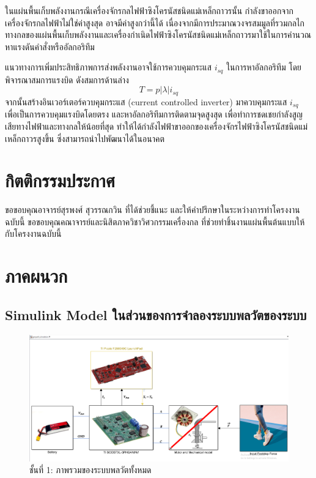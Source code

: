 \documentclass[11pt,a4paper]{article}
\begin{document}
ในแผ่นพื้นเก็บพลังงานกรณีเครื่องจักรกลไฟฟ้าซิงโครนัสชนิดแม่เหล็กถาวรนั้น กำลังขาออกจากเครื่องจักรกลไฟฟ้าไม่ใช่ค่าสูงสุด อาจมีค่าสูงกว่านี้ได้ เนื่องจากมีการประมาณวงจรสมมูลที่รวมกลไกทางกลของแผ่นพื้นเก็บพลังงานและเครื่องกำเนิดไฟฟ้าซิงโครนัสชนิดแม่เหล็กถาวรมาใช้ในการคำนวณหาแรงดันคำสั่งหรืออัลกอริทึม

แนวทางการเพิ่มประสิทธิภาพการส่งพลังงานอาจใช้การควบคุมกระแส $i_{sq}$ ในการหาอัลกอริทึม โดยพิจารณาสมการแรงบิด ดังสมการด้านล่าง
\begin{equation}
    T = p|\lambda|i_{sq}
\end{equation}
จากนั้นสร้างอินเวอร์เตอร์ควบคุมกระแส (current controlled inverter) มาควบคุมกระแส $i_{sq}$ เพื่อเป็นการควบคุมแรงบิดโดยตรง และหาอัลกอริทึมการติดตามจุดสูงสุด เพื่อทำการชดเชยกำลังสูญเสียทางไฟฟ้าและทางกลให้น้อยที่สุด ทำให้ได้กำลังไฟฟ้าขาออกของเครื่องจักรไฟฟ้าซิงโครนัสชนิดแม่เหล็กถาวรสูงขึ้น ซึ่งสามารถนำไปพัฒนาได้ในอนาคต





\section{กิตติกรรมประกาศ}
ขอขอบคุณอาจารย์สุรพงศ์ สุวรรณกวิน ที่ได้ช่วยชี้แนะ และให้คำปรึกษาในระหว่างการทำโครงงานฉบับนี้ ขอขอบคุณคณาจารย์และนิสิตภาควิชาวิศวกรรมเครื่องกล ที่ช่วยทำชิ้นงานแผ่นพื้นต้นแบบให้กับโครงงานฉบับนี้

\section{ภาคผนวก}

\subsection{Simulink Model ในส่วนของการจำลองระบบพลวัตของระบบ}

\begin{figure}[H]
    \centering
    \includegraphics[width=\textwidth]{layer0.png}
    \caption{ชั้นที่ 1: ภาพรวมของระบบพลวัตทั้งหมด}
\end{figure}
\end{document}
